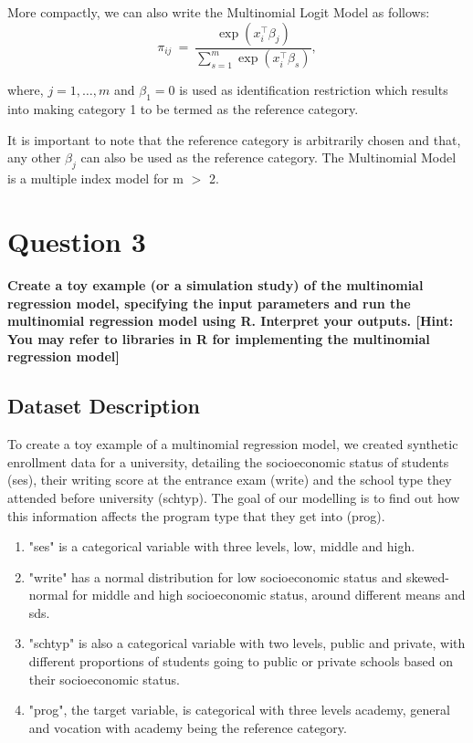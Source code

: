 \documentclass[12pt]{article}
\begin{document}
More compactly, we can also write the Multinomial Logit Model as follows:
\begin{equation}
  \pi_{ij} ~=~ \frac{\exp(x_i^\top \beta_j)}{\sum_{s = 1}^m \exp(x_i^\top \beta_s)},
\end{equation}

where, $j = 1, \dots, m$ and $\beta_1 = 0$ is used as identification restriction which results into making category 1 to be termed as the reference category.

It is important to note that the reference category is arbitrarily chosen and that, any other $ \beta_j $ can also be used as the reference category. The Multinomial Model is a multiple index model for m $>$ 2.

\section{Question 3}
\textbf{Create a toy example (or a simulation study) of the multinomial regression model, specifying the input parameters and run the multinomial
regression model using R. Interpret your outputs. [Hint: You may refer to libraries in R for implementing the multinomial regression model]}

\subsection{Dataset Description}
To create a toy example of a multinomial regression model, we created synthetic enrollment data for a university, detailing the socioeconomic status of students (ses), their writing score at the entrance exam (write) and the school type they attended before university (schtyp). The goal of our modelling is to find out how this information affects the program type that they get into (prog). 

\begin{enumerate}
    \item "ses" is a categorical variable with three levels, low, middle and high.
    \item "write" has a normal distribution for low socioeconomic status and skewed-normal for middle and high socioeconomic status, around different means and sds.
    \item "schtyp" is also a categorical variable with two levels, public and private, with different proportions of students going to public or private schools based on their socioeconomic status.
    \item "prog", the target variable, is categorical with three levels academy, general and vocation with academy being the reference category.
\end{enumerate}
\end{document}
